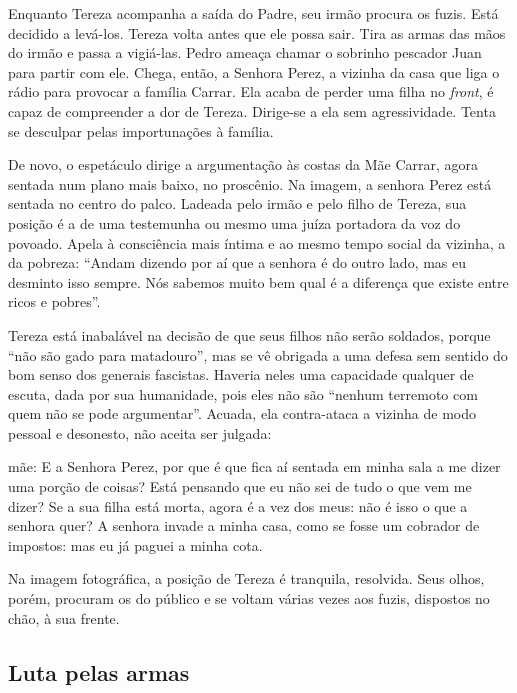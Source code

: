 Enquanto Tereza acompanha a saída do Padre, seu irmão procura os fuzis.
Está decidido a levá-los. Tereza volta antes que ele possa sair. Tira as
armas das mãos do irmão e passa a vigiá-las. Pedro ameaça chamar o
sobrinho pescador Juan para partir com ele. Chega, então, a Senhora
Perez, a vizinha da casa que liga o rádio para provocar a família
Carrar. Ela acaba de perder uma filha no {\it front}, é capaz de
compreender a dor de Tereza. Dirige-se a ela sem agressividade. Tenta se
desculpar pelas importunações à família.

De novo, o espetáculo dirige a argumentação às costas da Mãe Carrar,
agora sentada num plano mais baixo, no proscênio. Na imagem, a senhora
Perez está sentada no centro do palco. Ladeada pelo irmão e pelo filho de
Tereza, sua posição é a de uma testemunha ou mesmo uma juíza portadora
da voz do povoado. Apela à consciência mais íntima e ao mesmo tempo
social da vizinha, a da pobreza: “Andam dizendo por aí que a senhora é
do outro lado, mas eu desminto isso sempre. Nós sabemos muito bem qual é
a diferença que existe entre ricos e pobres”.

Tereza está inabalável na decisão de que seus filhos não serão soldados,
porque “não são gado para matadouro”, mas se vê obrigada a uma defesa
sem sentido do bom senso dos generais fascistas. Haveria neles
uma capacidade qualquer de escuta, dada por sua humanidade, pois eles
não são “nenhum terremoto com quem não se pode argumentar”. Acuada, ela
contra-ataca a vizinha de modo pessoal e desonesto, não aceita ser
julgada:

\startblockquote
{\sc mãe}: E a Senhora Perez, por que é que fica aí sentada em
minha sala a me dizer uma porção de coisas? Está pensando que eu não sei
de tudo o que vem me dizer? Se a sua filha está morta, agora é a vez dos
meus: não é isso o que a senhora quer? A senhora invade a minha casa,
como se fosse um cobrador de impostos: mas eu já paguei a minha cota.
\stopblockquote

Na imagem fotográfica, a posição de Tereza é tranquila, resolvida. Seus
olhos, porém, procuram os do público e se voltam várias vezes aos fuzis,
dispostos no chão, à sua frente.


\subsection{Luta pelas armas}

